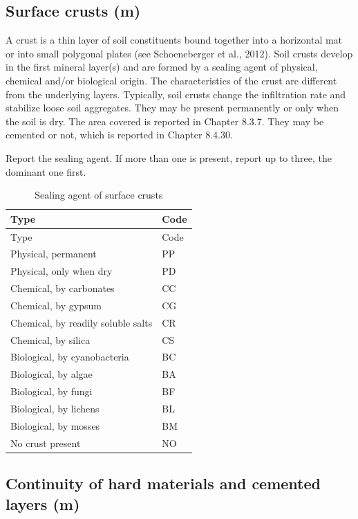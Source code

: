 \documentclass[
  letterpaper,
  DIV=11,
  numbers=noendperiod]{scrreprt}
\begin{document}
\hypertarget{surface-crusts-m}{%
\subsection{Surface crusts (m)}\label{surface-crusts-m}}

A crust is a thin layer of soil constituents bound together into a
horizontal mat or into small polygonal plates (see Schoeneberger et al.,
2012). Soil crusts develop in the first mineral layer(s) and are formed
by a sealing agent of physical, chemical and/or biological origin. The
characteristics of the crust are different from the underlying layers.
Typically, soil crusts change the infiltration rate and stabilize loose
soil aggregates. They may be present permanently or only when the soil
is dry. The area covered is reported in Chapter 8.3.7. They may be
cemented or not, which is reported in Chapter 8.4.30.

Report the sealing agent. If more than one is present, report up to
three, the dominant one first.

\begin{longtable}[]{@{}ll@{}}
\caption{Sealing agent of surface crusts}\tabularnewline
\toprule()
Type & Code \\
\midrule()
\endfirsthead
\toprule()
Type & Code \\
\midrule()
\endhead
Physical, permanent & PP \\
Physical, only when dry & PD \\
Chemical, by carbonates & CC \\
Chemical, by gypsum & CG \\
Chemical, by readily soluble salts & CR \\
Chemical, by silica & CS \\
Biological, by cyanobacteria & BC \\
Biological, by algae & BA \\
Biological, by fungi & BF \\
Biological, by lichens & BL \\
Biological, by mosses & BM \\
No crust present & NO \\
\bottomrule()
\end{longtable}

\hypertarget{continuity-of-hard-materials-and-cemented-layers-m}{%
\subsection{Continuity of hard materials and cemented layers
(m)}\label{continuity-of-hard-materials-and-cemented-layers-m}}
\end{document}
